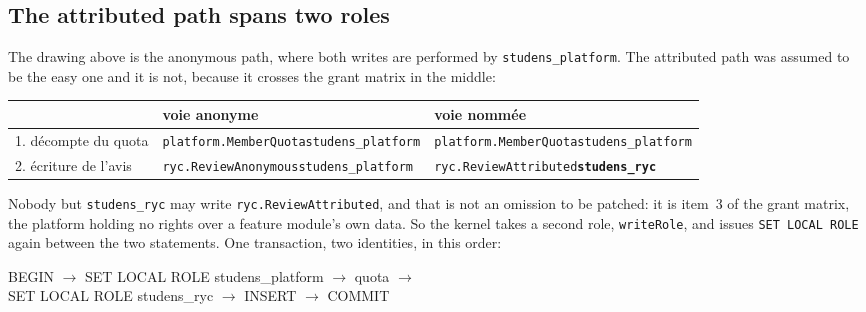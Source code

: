 \documentclass[11pt,a4paper]{article}
\begin{document}
\subsection{The attributed path spans two roles}\label{sec:tworoles}

The drawing above is the anonymous path, where both writes are performed by
\texttt{studens\_platform}. The attributed path was assumed to be the easy one
and it is not, because it crosses the grant matrix in the middle:

\begin{center}
\sffamily\scriptsize
\renewcommand{\arraystretch}{1.25}
\begin{tabular}{@{}p{3.9cm}p{4.5cm}p{4.5cm}@{}}
\toprule
& \textbf{voie anonyme} & \textbf{voie nomm\'ee} \\
\midrule
1. d\'ecompte du quota
  & \texttt{platform.MemberQuota}\newline \color{studens}\texttt{studens\_platform}
  & \texttt{platform.MemberQuota}\newline \color{studens}\texttt{studens\_platform} \\
\midrule
\rowcolor{anonlt}
2. \'ecriture de l'avis
  & \texttt{ryc.ReviewAnonymous}\newline \color{studens}\texttt{studens\_platform}
  & \texttt{ryc.ReviewAttributed}\newline \textbf{\texttt{studens\_ryc}} \\
\bottomrule
\end{tabular}
\end{center}

Nobody but \texttt{studens\_ryc} may write \texttt{ryc.ReviewAttributed}, and
that is not an omission to be patched: it is item~3 of the grant matrix, the
platform holding no rights over a feature module's own data. So the kernel takes
a second role, \texttt{writeRole}, and issues \texttt{SET LOCAL ROLE} again
between the two statements. One transaction, two identities, in this order:

\begin{center}
\ttfamily\scriptsize
BEGIN $\rightarrow$ SET LOCAL ROLE studens\_platform $\rightarrow$ quota
$\rightarrow$\\[0.6mm]
SET LOCAL ROLE studens\_ryc $\rightarrow$ INSERT $\rightarrow$ COMMIT
\end{center}
\end{document}
